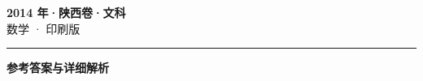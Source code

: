 \documentclass[zihao=5, a4paper]{ctexart}
\begin{document}
\begin{center}
  {\Large\bfseries 2014 年·陕西卷·文科}\\[4pt]
  {\large 数学 · 印刷版}
\end{center}
\medskip
{}

\par\bigskip\hrule\bigskip
{}
\Needspace{0.55\textheight}
\begin{center}{\large\bfseries 参考答案与详细解析}\end{center}
\smallskip

\end{document}
